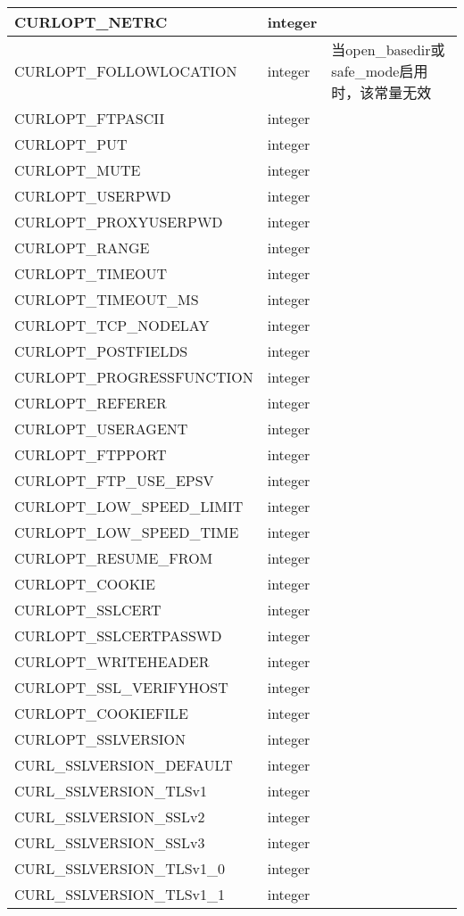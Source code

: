 \begin{longtable}{|m{150pt}|m{40pt}|m{200pt}|}
\hline
CURLOPT\_NETRC&integer&\\
\hline
CURLOPT\_FOLLOWLOCATION&integer&当open\_basedir或safe\_mode启用时，该常量无效\\
\hline
CURLOPT\_FTPASCII&integer&\\
\hline
CURLOPT\_PUT&integer&\\
\hline
CURLOPT\_MUTE&integer&\\
\hline
CURLOPT\_USERPWD&integer&\\
\hline
CURLOPT\_PROXYUSERPWD&integer&\\
\hline
CURLOPT\_RANGE&integer&\\
\hline
CURLOPT\_TIMEOUT&integer&\\
\hline
CURLOPT\_TIMEOUT\_MS&integer&\\
\hline
CURLOPT\_TCP\_NODELAY&integer&\\
\hline
CURLOPT\_POSTFIELDS&integer&\\
\hline
CURLOPT\_PROGRESSFUNCTION&integer&\\
\hline
CURLOPT\_REFERER&integer&\\
\hline
CURLOPT\_USERAGENT&integer&\\
\hline
CURLOPT\_FTPPORT&integer&\\
\hline
CURLOPT\_FTP\_USE\_EPSV&integer&\\
\hline
CURLOPT\_LOW\_SPEED\_LIMIT&integer&\\
\hline
CURLOPT\_LOW\_SPEED\_TIME&integer&\\
\hline
CURLOPT\_RESUME\_FROM&integer&\\
\hline
CURLOPT\_COOKIE&integer&\\
\hline
CURLOPT\_SSLCERT&integer&\\
\hline
CURLOPT\_SSLCERTPASSWD&integer&\\
\hline
CURLOPT\_WRITEHEADER&integer&\\
\hline
CURLOPT\_SSL\_VERIFYHOST&integer&\\
\hline
CURLOPT\_COOKIEFILE&integer&\\
\hline
CURLOPT\_SSLVERSION&integer&\\
\hline
CURL\_SSLVERSION\_DEFAULT&integer&\\
\hline
CURL\_SSLVERSION\_TLSv1&integer&\\
\hline
CURL\_SSLVERSION\_SSLv2&integer&\\
\hline
CURL\_SSLVERSION\_SSLv3&integer&\\
\hline
CURL\_SSLVERSION\_TLSv1\_0&integer&\\
\hline
CURL\_SSLVERSION\_TLSv1\_1&integer&\\

\end{longtable}
